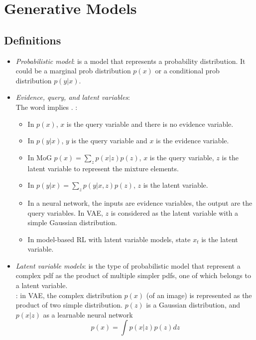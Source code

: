 \chapter{Generative Models}

\section{Definitions}
\label{sec:vae-defs}
\begin{itemize}
	\item \textit{Probabilistic model}: is a model that represents a probability distribution. It could be a marginal \ac{prob} distribution $p(x)$ or a conditional \ac{prob} distribution $p(y|x)$.
	\item \textit{Evidence, query, and latent variables}:\\
	The word  implies . \Eg:
	\begin{itemize}
		\item In $p(x)$, $x$ is the query variable and there is no evidence variable.
		\item In $p(y|x)$, $y$ is the query variable and $x$ is the evidence variable.
		\item In \ac{MoG} $p(x) = \sum_z p(x|z) p(z)$, $x$ is the query variable, $z$ is the latent variable to represent the mixture elements.		
		\item In $p(y|x) = \sum_z p(y|x,z) p(z)$, $z$ is the latent variable.
		\item In a neural network, the inputs are evidence variables, the output are the query variables. In \ac{VAE}, $z$ is considered as the latent variable with a simple Gaussian distribution.
		\item In model-based \ac{RL} with latent variable models, state $x_t$ is the latent variable.
	\end{itemize}
	\item \textit{Latent variable models}: is the type of probabilistic model that represent a complex \ac{pdf} as the product of multiple simpler \ac{pdf}s, one of which belongs to a latent variable.\\
	\Eg: in \ac{VAE}, the complex distribution $p(x)$ (of an image) is represented as the product of two simple distribution. $p(z)$ is a Gaussian distribution, and $p(x|z)$ as a learnable neural network
	\[ p(x) = \int p(x|z) p(z) dz \]
\end{itemize}

